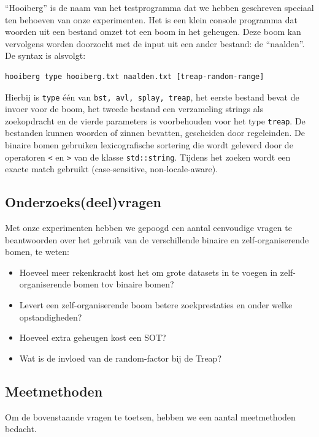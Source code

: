 \documentclass[a4paper,10pt]{article}
\begin{document}
``Hooiberg'' is de naam van het testprogramma dat we hebben geschreven speciaal ten behoeven van onze experimenten.
Het is een klein console programma dat woorden uit een bestand omzet tot een boom in het geheugen. 
Deze boom kan vervolgens worden doorzocht met de input uit een ander bestand: de ``naalden''.
De syntax is alsvolgt:
\begin{verbatim}
hooiberg type hooiberg.txt naalden.txt [treap-random-range]
\end{verbatim}
Hierbij is \texttt{type} \'e\'en van \texttt{bst, avl, splay, treap}, het eerste bestand bevat de invoer voor de boom, het tweede bestand een verzameling strings als zoekopdracht en de vierde parameters is voorbehouden voor het type \texttt{treap}.
De bestanden kunnen woorden of zinnen bevatten, gescheiden door regeleinden. De binaire bomen gebruiken lexicografische sortering 
die wordt geleverd door de operatoren \texttt{<} en \texttt{>} van de klasse \texttt{std::string}. Tijdens het zoeken wordt een
exacte match gebruikt (case-sensitive, non-locale-aware).

\subsection{Onderzoeks(deel)vragen}

Met onze experimenten hebben we gepoogd een aantal eenvoudige vragen te beantwoorden over het gebruik van de verschillende
binaire en zelf-organiserende bomen, te weten:

\begin{itemize}
\item Hoeveel meer rekenkracht kost het om grote datasets in te voegen in zelf-organiserende bomen tov binaire bomen?
\item Levert een zelf-organiserende boom betere zoekprestaties en onder welke opstandigheden?
\item Hoeveel extra geheugen kost een SOT?
\item Wat is de invloed van de random-factor bij de Treap?
\end{itemize}

\subsection{Meetmethoden}

Om de bovenstaande vragen te toetsen, hebben we een aantal meetmethoden bedacht.
\end{document}
